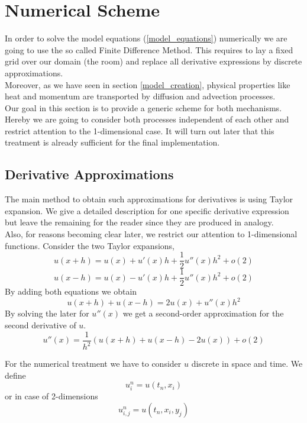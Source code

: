 \documentclass[]{article}
\begin{document}
\section{Numerical Scheme}
In order to solve the model equations (\ref{model_equations}) numerically we are going to use the so called Finite Difference Method. This requires to lay a fixed grid over our domain (the room) and replace all derivative expressions by discrete approximations.\\
Moreover, as we have seen in section \ref{model_creation}, physical properties like
heat and momentum are transported by diffusion and advection processes.\\
Our goal in this section is to provide a generic scheme for both mechanisms.
Hereby we are going to consider both processes independent of each other and restrict
attention to the 1-dimensional case. It will turn out later that this treatment is already
sufficient for the final implementation.\\

\subsection{Derivative Approximations} \label{derivate_approx}
The main method to obtain such approximations for derivatives is using Taylor expansion.
We give a detailed description for one specific derivative expression but leave the remaining for the reader since they are produced in analogy.\\
Also, for reasons becoming clear later, we restrict our attention to 1-dimensional functions.
Consider the two Taylor expansions,
\begin{equation*}
u(x+h)=u(x)+u'(x)h+\frac{1}{2}u''(x)h^2+o(2)
\end{equation*}
\begin{equation*}
u(x-h)=u(x)-u'(x)h+\frac{1}{2}u''(x)h^2+o(2)
\end{equation*}
By adding both equations we obtain
\begin{equation*}
u(x+h)+u(x-h)=2u(x)+u''(x)h^2
\end{equation*}
By solving the later for $u''(x)$ we get a second-order approximation for the second derivative
of $u$.
\begin{equation*} 
u''(x)=\frac{1}{h^2}(u(x+h)+u(x-h)-2u(x)) + o(2)
\end{equation*}

For the numerical treatment we have to consider $u$ discrete in space and time.
We define 
\begin{equation*}
u_{i}^{n}=u(t_{n}, x_{i})
\end{equation*}
or in case of 2-dimensions
\begin{equation*}
u_{i,j}^{n}=u(t_{n}, x_{i}, y_{j})
\end{equation*}
\end{document}
